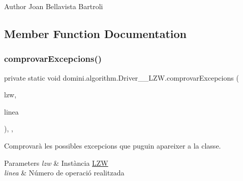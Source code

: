 \begin{DoxyAuthor}{Author}
Joan Bellavista Bartroli 
\end{DoxyAuthor}


\subsection{Member Function Documentation}
\mbox{\label{classdomini_1_1algorithm_1_1Driver____LZW_a3f609a2c3a22d0c7d11a5ff4e015e433}} 
\subsubsection{\texorpdfstring{comprovar\+Excepcions()}{comprovarExcepcions()}}
{\footnotesize\ttfamily private static void domini.\+algorithm.\+Driver\+\_\+\+\_\+\+L\+Z\+W.\+comprovar\+Excepcions (\begin{DoxyParamCaption}\item[{\hyperlink{classdomini_1_1algorithm_1_1LZW}{L\+ZW}}]{lzw,  }\item[{String}]{linea }\end{DoxyParamCaption})\hspace{0.3cm}{\ttfamily [inline]}, {\ttfamily [static]}, {\ttfamily [private]}}



Comprovarà les possibles excepcions que puguin apareixer a la classe. 


\begin{DoxyParams}{Parameters}
{\em lzw} & Instància \hyperlink{classdomini_1_1algorithm_1_1LZW}{L\+ZW} \\
\hline
{\em linea} & Número de operació realitzada \\
\hline
\end{DoxyParams}
\mbox{\label{classdomini_1_1algorithm_1_1Driver____LZW_a1500b5c33b09cbaad4645f6d87eecc4c}} 
